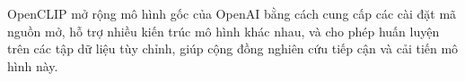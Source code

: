 OpenCLIP mở rộng mô hình gốc của OpenAI bằng cách cung cấp các cài đặt mã nguồn mở, hỗ trợ nhiều kiến trúc mô hình khác nhau, và cho phép huấn luyện trên các tập dữ liệu tùy chỉnh, giúp cộng đồng nghiên cứu tiếp cận và cải tiến mô hình này.




    
    
    

